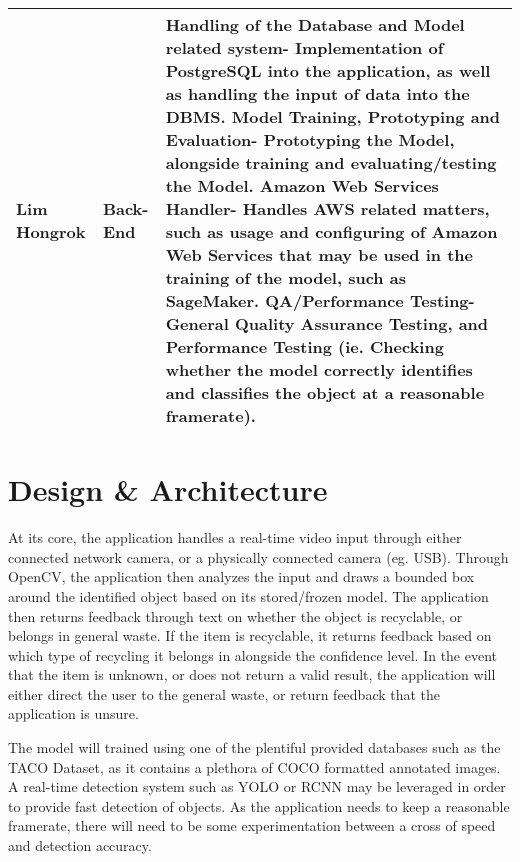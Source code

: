 \documentclass[conference]{IEEEtran}
\begin{document}
\begin{table}[htbp]
\begin{tabular}{|p{1.5cm}|p{1.5cm}|p{4.7cm}|}
Lim Hongrok & Back-End & 
\newline Handling of the Database and Model related system\newline- Implementation of PostgreSQL into the application, as well as handling the input of data into the DBMS.
\newline 
\newline Model Training, Prototyping and Evaluation\newline- Prototyping the Model, alongside training and evaluating/testing the Model.
\newline 
\newline Amazon Web Services Handler\newline- Handles AWS related matters, such as usage and configuring of Amazon Web Services that may be used in the training of the model, such as SageMaker.
\newline 
\newline QA/Performance Testing\newline- General Quality Assurance Testing, and Performance Testing (ie. Checking whether the model correctly identifies and classifies the object at a reasonable framerate).
\\ \hline
\end{tabular}
\end{table}

\newpage

\section{Design \& Architecture}
At its core, the application handles a real-time video input through either connected network camera, or a physically connected camera (eg. USB). Through OpenCV, the application then analyzes the input and draws a bounded box around the identified object based on its stored/frozen model. The application then returns feedback through text on whether the object is recyclable, or belongs in general waste. If the item is recyclable, it returns feedback based on which type of recycling it belongs in alongside the confidence level. In the event that the item is unknown, or does not return a valid result, the application will either direct the user to the general waste, or return feedback that the application is unsure.

The model will trained using one of the plentiful provided databases such as the TACO Dataset, as it contains a plethora of COCO formatted annotated images. A real-time detection system such as YOLO or RCNN may be leveraged in order to provide fast detection of objects. As the application needs to keep a reasonable framerate, there will need to be some experimentation between a cross of speed and detection accuracy.
\end{document}
